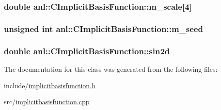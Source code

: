 \label{classanl_1_1CImplicitBasisFunction_a5b7f88a072d9fd631e277eca1975cfd5}
\hypertarget{classanl_1_1CImplicitBasisFunction_a6a72d1b2386593a8b3f0c8e384e95212}{
\subsubsection[{m\_\-scale}]{\setlength{\rightskip}{0pt plus 5cm}double {\bf anl::CImplicitBasisFunction::m\_\-scale}\mbox{[}4\mbox{]}}}
\label{classanl_1_1CImplicitBasisFunction_a6a72d1b2386593a8b3f0c8e384e95212}
\hypertarget{classanl_1_1CImplicitBasisFunction_a744ec9f082626325b9dbe9b2fea72cea}{
\subsubsection[{m\_\-seed}]{\setlength{\rightskip}{0pt plus 5cm}unsigned int {\bf anl::CImplicitBasisFunction::m\_\-seed}}}
\label{classanl_1_1CImplicitBasisFunction_a744ec9f082626325b9dbe9b2fea72cea}
\hypertarget{classanl_1_1CImplicitBasisFunction_af0dd30c4091a08c6e3117e55b416b97e}{
\subsubsection[{sin2d}]{\setlength{\rightskip}{0pt plus 5cm}double {\bf anl::CImplicitBasisFunction::sin2d}}}
\label{classanl_1_1CImplicitBasisFunction_af0dd30c4091a08c6e3117e55b416b97e}


The documentation for this class was generated from the following files:\begin{DoxyCompactItemize}
\item 
include/\hyperlink{implicitbasisfunction_8h}{implicitbasisfunction.h}\item 
src/\hyperlink{implicitbasisfunction_8cpp}{implicitbasisfunction.cpp}\end{DoxyCompactItemize}
